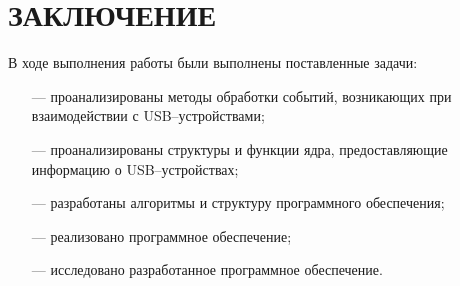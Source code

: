 \chapter*{ЗАКЛЮЧЕНИЕ}

В ходе выполнения работы были выполнены поставленные задачи:
\begin{itemize}
	\item[---] проанализированы методы обработки событий, возникающих при взаимодействии с USB–устройствами;
	\item[---] проанализированы структуры и функции ядра, предоставляющие информацию о USB–устройствах;
	\item[---] разработаны алгоритмы и структуру программного обеспечения;
	\item[---] реализовано программное обеспечение;
	\item[---] исследовано разработанное программное обеспечение.
\end{itemize}
